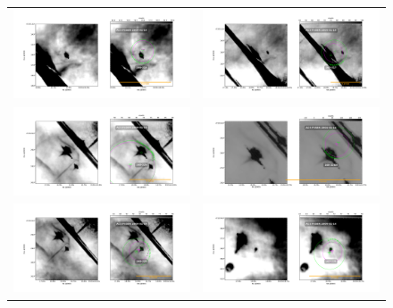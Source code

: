 \documentclass{article}
\begin{document}
\begin{figure}[htp]
\centering
\begin{tabular}{l l}
    \includegraphics[width=0.5\linewidth]{j8oc01010_wcs/166-316-Bally_01-images.pdf}
   &\includegraphics[width=0.5\linewidth]{j8oc01010_wcs/167-317-Bally_01-images.pdf}\\
   \includegraphics[width=0.5\linewidth]{j8oc01010_wcs/168-326-Bally_01-images.pdf}
   &\includegraphics[width=0.5\linewidth]{j8oc01010_wcs/168-326N-Bally_01-images.pdf}\\
   \includegraphics[width=0.5\linewidth]{j8oc01010_wcs/168-328-Bally_01-images.pdf}
 &\includegraphics[width=0.5\linewidth]{j8oc01010_wcs/169-338-Bally_01-images.pdf}\\
   
 \end{tabular}
\end{figure}
\end{document}
